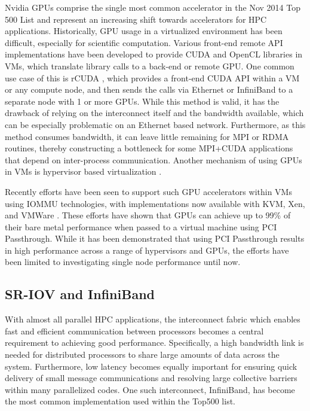 \documentclass[10pt]{sigplanconf}
\begin{document}
Nvidia GPUs comprise the single most common accelerator in the Nov 2014 Top 500 List \cite{www-top500} and represent an increasing shift towards accelerators for HPC applications. Historically, GPU usage in a virtualized environment has been difficult, especially for scientific computation. Various front-end remote API implementations have been developed to provide CUDA and OpenCL libraries in VMs, which translate library calls to a back-end or remote GPU. One common use case of this is rCUDA \cite{duato2011enabling}, which provides a front-end CUDA API within a VM or any compute node, and then sends the calls via Ethernet or InfiniBand to a separate node with 1 or more GPUs. While this method is valid, it has the drawback of relying on the interconnect itself and the bandwidth available, which can be especially problematic on an Ethernet based network. Furthermore, as this method consumes bandwidth, it can leave little remaining for MPI or RDMA routines, thereby constructing a bottleneck for some MPI+CUDA applications that depend on inter-process communication.  Another mechanism of using GPUs in VMs is hypervisor based virtualization \cite{suzuki2014gpuvm}.

Recently efforts have been seen to support such GPU accelerators within VMs using IOMMU technologies, with implementations now available with KVM, Xen, and VMWare \cite{Walters2014cloud, Younge2014hpgc, tian2014full, Vu2014}.  These efforts have shown that GPUs can achieve up to 99\% of their bare metal performance when passed to a virtual machine using PCI Passthrough.  %
While it has been demonstrated that using PCI Passthrough results in high performance across a range of hypervisors and GPUs, the efforts have been limited to investigating single node performance until now. 

\subsection{SR-IOV and InfiniBand}

With almost all parallel HPC applications, the interconnect fabric which enables fast and efficient communication between processors becomes a central requirement to achieving good performance. Specifically, a high bandwidth link is needed for distributed processors to share large amounts of data across the system. Furthermore, low latency becomes equally important for ensuring quick delivery of small message communications and resolving large collective barriers within many parallelized codes. One such interconnect, InfiniBand, has become the most common implementation used within the Top500 list. %
\end{document}

